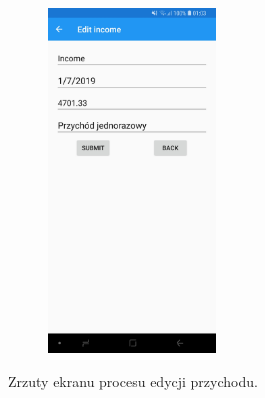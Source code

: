 \begin{figure}[!ht]
\begin{center}
\begin{subfigure}[b]{0.3\textwidth}
			\label{przychod_menu}
		\end{subfigure}
		\begin{subfigure}[b]{0.3\textwidth}
			\includegraphics[width=1.75in]{img/mobile/przychod_edycja.jpg}
			\label{przychod_edycja}
		\end{subfigure}
	\end{center}
	\caption{Zrzuty ekranu procesu edycji przychodu.}
\end{figure}

